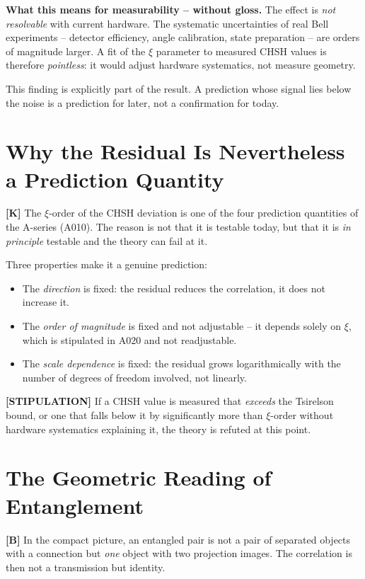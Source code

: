 \textbf{What this means for measurability -- without gloss.} The effect is
\emph{not resolvable} with current hardware. The systematic uncertainties of real
Bell experiments -- detector efficiency, angle calibration, state preparation --
are orders of magnitude larger. A fit of the $\xi$ parameter to measured CHSH
values is therefore \emph{pointless}: it would adjust hardware systematics, not
measure geometry.

This finding is explicitly part of the result. A prediction whose signal lies
below the noise is a prediction for later, not a confirmation for today.

\section{Why the Residual Is Nevertheless a Prediction Quantity}

\textbf{[K]} The $\xi$-order of the CHSH deviation is one of the four prediction
quantities of the A-series (A010). The reason is not that it is testable today,
but that it is \emph{in principle} testable and the theory can fail at it.

Three properties make it a genuine prediction:

\begin{itemize}
  \item The \emph{direction} is fixed: the residual reduces the correlation, it
    does not increase it.
  \item The \emph{order of magnitude} is fixed and not adjustable -- it depends
    solely on $\xi$, which is stipulated in A020 and not readjustable.
  \item The \emph{scale dependence} is fixed: the residual grows logarithmically
    with the number of degrees of freedom involved, not linearly.
\end{itemize}

\textbf{[STIPULATION]} If a CHSH value is measured that \emph{exceeds} the
Tsirelson bound, or one that falls below it by significantly more than $\xi$-order
without hardware systematics explaining it, the theory is refuted at this point.

\section{The Geometric Reading of Entanglement}

\textbf{[B]} In the compact picture, an entangled pair is not a pair of separated
objects with a connection but \emph{one} object with two projection images. The
correlation is then not a transmission but identity.

